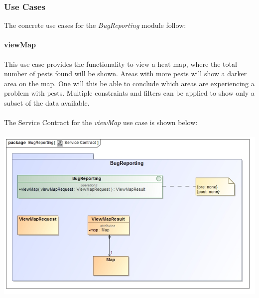 \documentclass[11pt,a4paper,titlepage]{article}
\begin{document}
		\subsubsection{Use Cases}
		The concrete use cases for the \textit{BugReporting} module follow:
		\paragraph{viewMap }
		This use case provides the functionality to view a heat map, where the total number of pests found will be shown. Areas with more pests will show a darker area on the map. One will this be able to conclude which areas are experiencing a problem with pests. Multiple constraints and filters can be applied to show only a subset of the data available.\\\hfill\\
		The Service Contract for the \textit{viewMap} use case is shown below:\\\hfill\\		
		\includegraphics[width=\linewidth]{viewMapSC}
		
\end{document}
